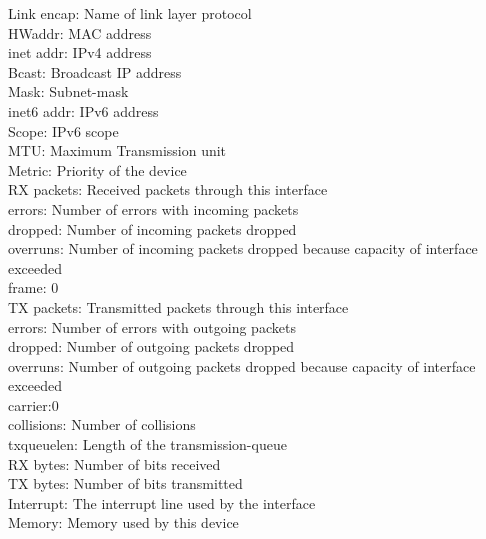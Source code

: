 Link encap: Name of link layer protocol  \\
HWaddr: MAC address \\
          
inet addr: IPv4 address \\
Bcast: Broadcast IP address \\
Mask: Subnet-mask \\
          
inet6 addr: IPv6 address \\
Scope: IPv6 scope \\
          
MTU: Maximum Transmission unit \\
Metric: Priority of the device \\
          
RX packets: Received packets through this interface \\
errors: Number of errors with incoming packets \\
dropped: Number of incoming packets dropped \\
overruns: Number of incoming packets dropped because capacity of interface exceeded  \\
frame: 0 \\
          
TX packets: Transmitted packets through this interface  \\
errors: Number of errors with outgoing packets  \\
dropped: Number of outgoing packets dropped \\
overruns: Number of outgoing packets dropped because capacity of interface exceeded  \\
carrier:0 \\
          
collisions: Number of collisions \\
txqueuelen: Length of the transmission-queue  \\
          
RX bytes: Number of bits received \\
TX bytes: Number of bits transmitted \\
          
Interrupt: The interrupt line used by the interface \\
Memory: Memory used by this device \\
